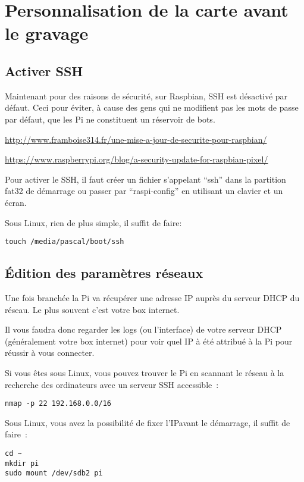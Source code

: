 \section{Personnalisation de la carte avant le gravage}

\subsection{Activer SSH}

Maintenant pour des raisons de sécurité, sur Raspbian, SSH est désactivé par défaut. Ceci pour éviter, à cause des gens qui ne modifient pas les mots de passe par défaut, que les Pi ne constituent un réservoir de bots.

\href{http://www.framboise314.fr/une-mise-a-jour-de-securite-pour-raspbian/}{http://www.framboise314.fr/une-mise-a-jour-de-securite-pour-raspbian/}


\href{https://www.raspberrypi.org/blog/a-security-update-for-raspbian-pixel/}{https://www.raspberrypi.org/blog/a-security-update-for-raspbian-pixel/}

Pour activer le SSH, il faut créer un fichier s'appelant ``ssh'' dans la partition fat32 de démarrage ou passer par ``raspi-config'' en utilisant un clavier et un écran.

Sous Linux, rien de plus simple, il suffit de faire:
\begin{verbatim}
touch /media/pascal/boot/ssh
\end{verbatim}

\subsection{\'Edition des paramètres réseaux}

Une fois branchée la Pi va récupérer une adresse IP auprès du serveur DHCP du réseau. Le plus souvent c'est votre box internet.

Il vous faudra donc regarder les logs (ou l'interface) de votre serveur DHCP (généralement votre box internet) pour voir quel IP à été attribué à la Pi pour réussir à vous connecter.

Si vous êtes sous Linux, vous pouvez trouver le Pi en scannant le réseau à la recherche des ordinateurs avec un serveur SSH accessible~:
\begin{verbatim}
nmap -p 22 192.168.0.0/16
\end{verbatim}


Sous Linux, vous avez la possibilité de fixer l'IPavant le démarrage, il suffit de faire~:
\begin{verbatim}
cd ~
mkdir pi
sudo mount /dev/sdb2 pi
\end{verbatim}

